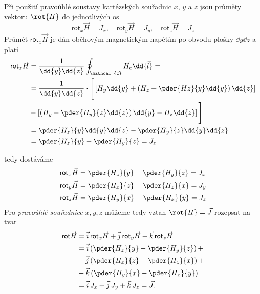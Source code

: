       Při použití pravoúhlé soustavy kartézských souřadnic \(x\), \(y\) a $z$ jsou průměty vektoru
      $\rot{H}$ do jednotlivých os
      \begin{equation}\label{TEMP:eq_amp_z3}
        \textsf{rot}_x\vec{H} = J_x,   \quad
        \textsf{rot}_y\vec{H} = J_y,   \quad
        \textsf{rot}_z\vec{H} = J_z    
      \end{equation}      
      Průmět $\textsf{rot}_x\vec{H}$ je dán oběhovým magnetickým napětím po obvodu plošky
      \(\dd{y}\dd{z}\) a platí
      \begin{align*}
        \textsf{rot}_x\vec{H} 
        &=\frac{1}{\dd{y}\dd{z}}\oint_{\mathcal{c}}\vec{H_c}\dd{\vec{l}} =               \nonumber\\
        &=\frac{1}{\dd{y}\dd{z}}\cdot\Biggl[\Biggr.\left[H_y\dd{y} 
         +\left(H_z + \pder{Hz}{y}\dd{y}\right)\dd{z}\right]                             \nonumber\\     
        &-\left[\left(H_y-\pder{H_y}{z}\dd{z}\right)\dd{y}-H_z\dd{z}\right]\Biggl.\Biggr]\nonumber\\
        &=\pder{H_z}{y}\dd{y}\dd{z} - \pder{H_y}{z}\dd{y}\dd{z}                          \nonumber\\    
        &=\pder{H_z}{y} - \pder{H_y}{z} = J_z
      \end{align*}       
      
         
      tedy dostáváme
      \begin{subequations}
        \begin{align}\label{TEMP:eq_amp_z5}
          \textsf{rot}_x\vec{H} &= \pder{H_z}{y} - \pder{H_y}{z} = J_x       \\
          \textsf{rot}_y\vec{H} &= \pder{H_x}{z} - \pder{H_z}{x} = J_y       \\
          \textsf{rot}_z\vec{H} &= \pder{H_y}{x} - \pder{H_x}{y} = J_z            
        \end{align}    
    \end{subequations}    
      Pro \emph{pravoúhlé souřadnice} $x, y, z$ můžeme tedy vztah $\rot{H} = \vec{J}$ rozepsat na
      tvar
      \begin{align*}
        \textsf{rot}\vec{H} 
          &= \vec{i}\,\textsf{rot}_x\vec{H} + 
             \vec{j}\,\textsf{rot}_y\vec{H} +
             \vec{k}\,\textsf{rot}_z\vec{H}                                    \\
          &= \vec{i}\left(\pder{H_z}{y} - \pder{H_y}{z}\right) +               \\
          &+ \vec{j}\left(\pder{H_x}{z} - \pder{H_z}{x}\right) +               \\
          &+ \vec{k}\left(\pder{H_y}{x} - \pder{H_x}{y}\right)                 \\  
          &= \vec{i}\,J_x + \vec{j}\,J_y + \vec{k}\,J_z = \vec{J}.
      \end{align*}          
      
